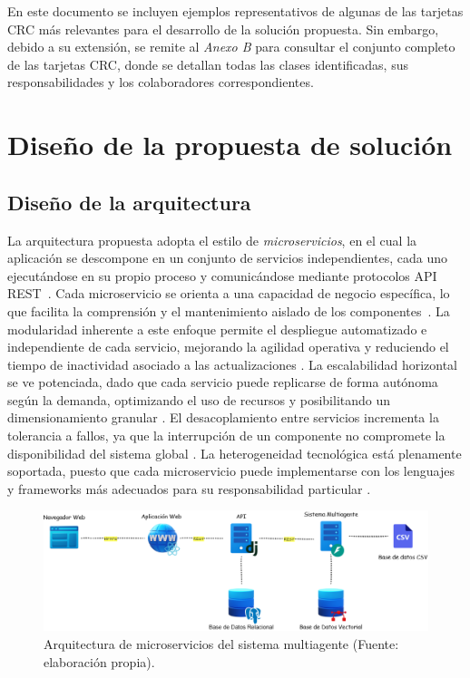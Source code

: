En este documento se incluyen ejemplos representativos de algunas de las tarjetas CRC más relevantes para el desarrollo de la solución propuesta. Sin embargo, debido a su extensión, se remite al \textit{Anexo B} para consultar el conjunto completo de las tarjetas CRC, donde se detallan todas las clases identificadas, sus responsabilidades y los colaboradores correspondientes.

\section{Diseño de la propuesta de solución}

\subsection{Diseño de la arquitectura}

La arquitectura propuesta adopta el estilo de \emph{microservicios}, en el cual la aplicación se descompone en un conjunto de servicios independientes, cada uno ejecutándose en su propio proceso y comunicándose mediante protocolos API REST~\cite{turn0search0,turn0search9}. Cada microservicio se orienta a una capacidad de negocio específica, lo que facilita la comprensión y el mantenimiento aislado de los componentes~\cite{turn0search6,turn0search0}. La modularidad inherente a este enfoque permite el despliegue automatizado e independiente de cada servicio, mejorando la agilidad operativa y reduciendo el tiempo de inactividad asociado a las actualizaciones \cite{turn0search8,turn0search3}. La escalabilidad horizontal se ve potenciada, dado que cada servicio puede replicarse de forma autónoma según la demanda, optimizando el uso de recursos y posibilitando un dimensionamiento granular \cite{turn0search3,turn1search0}. El desacoplamiento entre servicios incrementa la tolerancia a fallos, ya que la interrupción de un componente no compromete la disponibilidad del sistema global \cite{turn0search2,turn0search6}. La heterogeneidad tecnológica está plenamente soportada, puesto que cada microservicio puede implementarse con los lenguajes y frameworks más adecuados para su responsabilidad particular \cite{turn0search6,turn1search8}.

\begin{figure}[htbp] 
	\centering
	\includegraphics[width=1\textwidth]{images/Arquitectura.png} 
	\caption{Arquitectura de microservicios del sistema multiagente (Fuente: elaboración propia).}
	\label{fig:erquitectura_MAS}
\end{figure}

